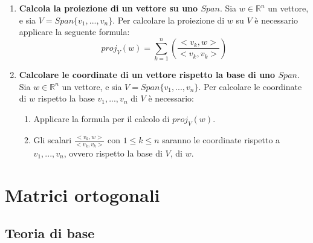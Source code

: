 \documentclass[12pt,a4paper,oneside]{book}
\begin{document}
\begin{enumerate}
\item \textbf{Calcola la proiezione di un vettore su uno $Span$}. \linebreak
	  Sia $w \in\mathbb{R}^n$ un vettore, e sia $V = Span\{v_1, ..., v_n\}$. Per calcolare la proiezione di
	  $w$ su $V$ è necessario applicare la seguente formula:
	  $$proj_V(w) = \sum_{k=1}^{n}\left(\frac{<v_k, w>}{<v_k, v_k>}\right)$$
	
\item \textbf{Calcolare le coordinate di un vettore rispetto la base di uno $Span$}. \linebreak
	  Sia $w \in\mathbb{R}^n$ un vettore, e sia $V = Span\{v_1, ..., v_n\}$. Per calcolare le coordinate di
	  $w$ rispetto la base $v_1, ..., v_n$ di $V$ è necessario:
	  
	  \begin{enumerate}
	  \item Applicare la formula per il calcolo di $proj_V(w)$.
	  \item Gli scalari $\frac{<v_k, w>}{<v_k, v_k>}$ con $1\leq k\leq n$ saranno le coordinate rispetto a
	  $v_1, ..., v_n$, ovvero rispetto la base di $V$, di $w$.
	  \end{enumerate}

\end{enumerate}






\newpage
				\chapter{Matrici ortogonali}
				

			   	 \section{Teoria di base}
			   	 
\end{document}
